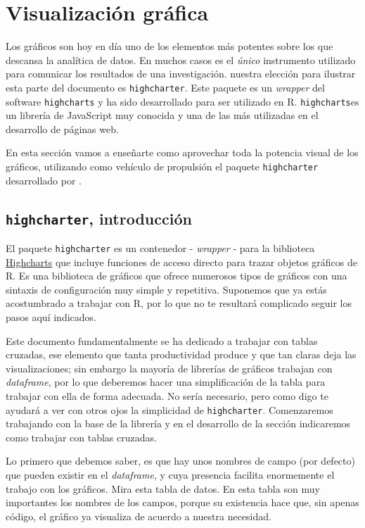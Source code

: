 \documentclass[
]{book}
\begin{document}
\hypertarget{tse08}{%
\chapter{Visualización gráfica}\label{tse08}}

Los gráficos son hoy en día uno de los elementos más potentes sobre los que descansa la analítica de datos. En muchos casos es el \emph{único} instrumento utilizado para comunicar los resultados de una investigación. nuestra elección para ilustrar esta parte del documento es \texttt{highcharter}. Este paquete es un \emph{wrapper} del software \texttt{highcharts} y ha sido desarrollado para ser utilizado en R. \texttt{highcharts}es un librería de JavaScript muy conocida y una de las más utilizadas en el desarrollo de páginas web.

En esta sección vamos a enseñarte como aprovechar toda la potencia visual de los gráficos, utilizando como vehículo de propulsión el paquete \texttt{highcharter} desarrollado por \citep{highcharter}.

\hypertarget{highcharter-introducciuxf3n}{%
\section{\texorpdfstring{\texttt{highcharter}, introducción}{highcharter, introducción}}\label{highcharter-introducciuxf3n}}

El paquete \texttt{highcharter} es un contenedor - \emph{wrapper} - para la biblioteca \href{https://www.highcharts.com/}{Highcharts} que incluye funciones de acceso directo para trazar objetos gráficos de R. Es una biblioteca de gráficos que ofrece numerosos tipos de gráficos con una sintaxis de configuración muy simple y repetitiva. Suponemos que ya estás acostumbrado a trabajar con R, por lo que no te resultará complicado seguir los pasos aquí indicados.

Este documento fundamentalmente se ha dedicado a trabajar con tablas cruzadas, ese elemento que tanta productividad produce y que tan claras deja las visualizaciones; sin embargo la mayoría de librerías de gráficos trabajan con \emph{dataframe}, por lo que deberemos hacer una simplificación de la tabla para trabajar con ella de forma adecuada. No sería necesario, pero como digo te ayudará a ver con otros ojos la simplicidad de \texttt{highcharter}. Comenzaremos trabajando con la base de la librería y en el desarrollo de la sección indicaremos como trabajar con tablas cruzadas.

Lo primero que debemos saber, es que hay unos nombres de campo (por defecto) que pueden existir en el \emph{dataframe}, y cuya presencia facilita enormemente el trabajo con los gráficos. Mira esta tabla de datos. En esta tabla son muy importantes los nombres de los campos, porque su existencia hace que, sin apenas código, el gráfico ya visualiza de acuerdo a nuestra necesidad.
\end{document}

